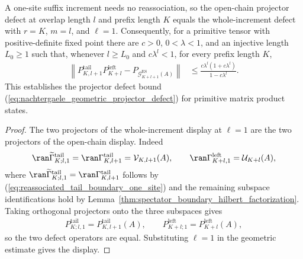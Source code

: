 \begin{lemma}
    \label{thm:primitive_fnw_openchain_defect_geometric}
    \leanok
    A one-site suffix increment needs no reassociation, so the open-chain
    projector defect at overlap length $l$ and prefix length $K$ equals the
    whole-increment defect with $r=K$, $m=l$, and $\ell=1$.  Consequently, for
    a primitive tensor with positive-definite fixed point there are $c>0$,
    $0<\lambda<1$, and an injective length $L_0\geq1$ such that, whenever
    $l\geq L_0$ and $c\lambda^l<1$, for every prefix length $K$,
    \begin{align}
        \left\lVert
        P^{\mathrm{tail}}_{K,l+1}P^{\mathrm{left}}_{K+l}
        -P_{\mathcal G_{K+l+1}^{\mathrm{ES}}(A)}
        \right\rVert
         & \leq \frac{c\lambda^l(1+c\lambda^l)}{1-c\lambda^l}.
        \label{eq:primitive_fnw_openchain_defect_geometric}
    \end{align}
    This establishes the projector defect bound
    (\ref{eq:nachtergaele_geometric_projector_defect}) for primitive matrix product
    states.
\end{lemma}

\begin{proof}
    \leanok
    The two projectors of the whole-increment display at $\ell=1$ are the two
    projectors of the open-chain display.  Indeed
    \begin{align}
        \ran\widetilde\Gamma^{\mathrm{tail}}_{K;l,1}
        =\ran\Gamma^{\mathrm{tail}}_{K,l+1}=\mathcal V_{K,l+1}(A),
        \qquad
        \ran\Gamma^{\mathrm{left}}_{K+l,1}=\mathcal U_{K+l}(A),
        \label{eq:openchain_defect_range_identifications}
    \end{align}
    where $\ran\widetilde\Gamma^{\mathrm{tail}}_{K;l,1}=\ran\Gamma^{\mathrm{tail}}_{K,l+1}$ follows by
    (\ref{eq:reassociated_tail_boundary_one_site}) and the remaining
    subspace identifications hold by Lemma~\ref{thm:spectator_boundary_hilbert_factorization}.  Taking
    orthogonal projectors onto the three subspaces gives
    \begin{align}
        P^{\mathrm{tail}}_{K;l,1}=P^{\mathrm{tail}}_{K,l+1}(A),
        \qquad
        P^{\mathrm{left}}_{K+l;1}=P^{\mathrm{left}}_{K+l}(A),
        \label{eq:openchain_defect_projector_identifications}
    \end{align}
    so the two defect operators are equal.  Substituting $\ell=1$ in the
    geometric estimate gives the display.
\end{proof}

